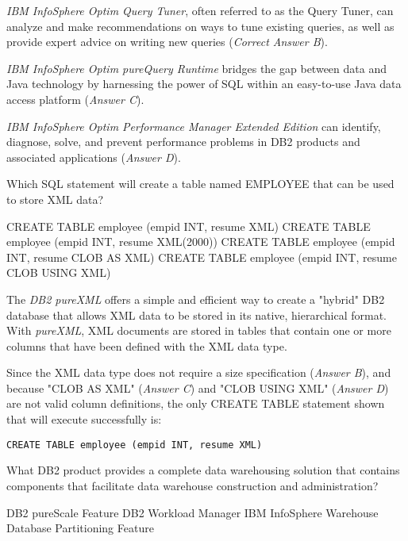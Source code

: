 \documentclass[answers, 11pt]{exam}
\begin{document}
\begin{questions}
\begin{solution}
\textit{IBM InfoSphere Optim Query Tuner}, often referred to as the Query Tuner, can analyze
and make recommendations on ways to tune existing queries, as well as provide expert advice
on writing new queries (\textit{Correct Answer B}).
\par

\textit{IBM InfoSphere Optim pureQuery Runtime} bridges the gap between data and Java technology
by harnessing the power of SQL within an easy-to-use Java data access platform (\textit{Answer C}).
\par

\textit{IBM InfoSphere Optim Performance Manager Extended Edition} can identify, diagnose, solve, 
and prevent performance problems in DB2 products and associated applications (\textit{Answer D}).


\end{solution}

\question[1]
Which SQL statement will create a table named EMPLOYEE that can be used to store XML data?
\begin{choices}
\CorrectChoice CREATE TABLE employee (empid INT, resume XML)
\choice CREATE TABLE employee (empid INT, resume XML(2000))
\choice CREATE TABLE employee (empid INT, resume CLOB AS XML)
\choice CREATE TABLE employee (empid INT, resume CLOB USING XML)
\end{choices}

\begin{solution}
The \textit{DB2 pureXML} offers a simple and efficient way to create a "hybrid" DB2 database
that allows XML data to be stored in its native, hierarchical format. With \textit{pureXML}, XML
documents are stored in tables that contain one or more columns that have been defined with
the XML data type.
\par

Since the XML data type does not require a size specification (\textit{Answer B}), and because
"CLOB AS XML" (\textit{Answer C}) and "CLOB USING XML" (\textit{Answer D}) are not valid column
definitions, the only CREATE TABLE statement shown that will execute successfully is:

\begin{verbatim}
CREATE TABLE employee (empid INT, resume XML)
\end{verbatim}


\end{solution}


\question[1]
What DB2 product provides a complete data warehousing solution that contains components
that facilitate data warehouse construction and administration?
\begin{choices}
\choice DB2 pureScale Feature
\choice DB2 Workload Manager
\CorrectChoice IBM InfoSphere Warehouse
\choice Database Partitioning Feature
\end{choices}


\end{questions}
\end{document}
